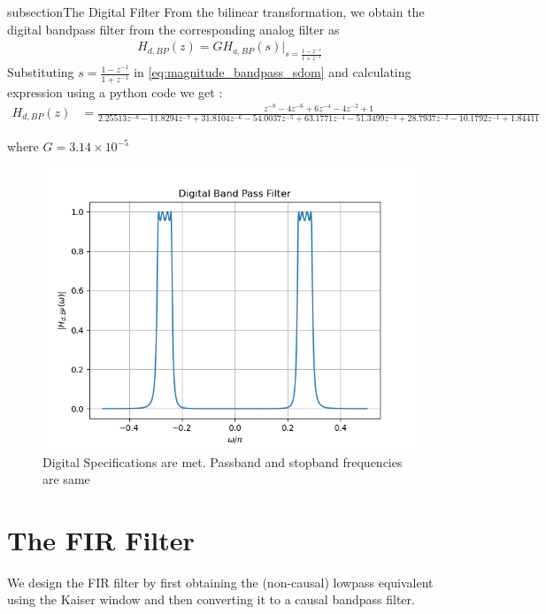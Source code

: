 \documentclass{article}
\begin{document}
\begin{enumerate}
subsection{The Digital Filter}
From the bilinear transformation, we obtain the digital bandpass filter from the corresponding analog filter as
\begin{align}
    H_{d,BP}(z) = GH_{a,BP}(s)\vert_{s = \frac{1-z^{-1}}{1 + z^{-1}}}
\end{align}
Substituting $s=\frac{1-z^{-1}}{1+z^{-1}}$ in \eqref{eq:magnitude_bandpass_sdom} and calculating expression using a python code we get :
\begin{align}
    H_{d,BP}(z) &= \frac{z^{-8} - 4z^{-6} + 6z^{-4} - 4z^{-2} + 1}{2.25513z^{-8} - 11.8294z^{-7} + 31.8104z^{-6} - 54.0037z^{-5} + 63.1771z^{-4} - 51.3499z^{-3} + 28.7937z^{-2} - 10.1792z^{-1} + 1.84411}
\end{align}

where $G=3.14\times 10^{-5}$    
\begin{figure}[H]
\centering
\includegraphics[width=1\columnwidth]{figs/5.png}
\caption{Digital Specifications are met. Passband and stopband frequencies are same}
\label{fig:Digital_BPF}
\end{figure}
\end{enumerate}

\section{The FIR Filter}
We design the FIR filter by first obtaining the (non-causal) lowpass equivalent using the Kaiser window
and then
converting it to a causal bandpass filter.
\end{document}
